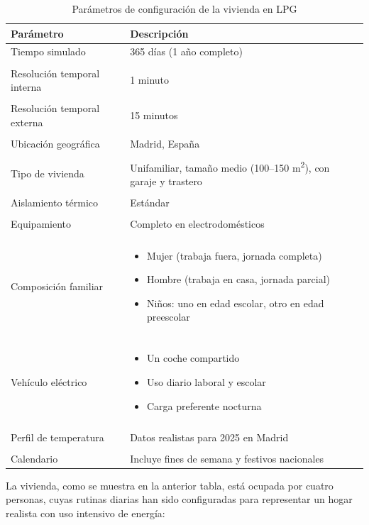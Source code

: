 \begin{table}[H]
    \centering
    \begin{tabular}{p{4cm} p{9.8cm}}
        \\[-1.5ex] %
        \toprule
        \textbf{Parámetro} & \textbf{Descripción} \\
        \midrule
        Tiempo simulado & 365 días (1 año completo) \\
        \\[-1.5ex]
        Resolución temporal interna & 1 minuto \\
        \\[-1.5ex]
        Resolución temporal externa & 15 minutos \\
        \\[-1.5ex]
        Ubicación geográfica & Madrid, España \\
        \\[-1.5ex]
        Tipo de vivienda & Unifamiliar, tamaño medio (100–150 m\textsuperscript{2}), con garaje y trastero \\
        \\[-1.5ex]
        Aislamiento térmico & Estándar \\
        \\[-1.5ex]
        Equipamiento & Completo en electrodomésticos \\
        \\[-1.5ex]
        Composición familiar &
        \begin{itemize}[noitemsep, topsep=-10pt]
            \item Mujer (trabaja fuera, jornada completa)
            \item Hombre (trabaja en casa, jornada parcial)
            \item Niños: uno en edad escolar, otro en edad preescolar
        \end{itemize} \\
        \\[-1.5ex]
        Vehículo eléctrico &
        \begin{itemize}[noitemsep, topsep=-10pt]
            \item Un coche compartido
            \item Uso diario laboral y escolar
            \item Carga preferente nocturna
        \end{itemize} \\
        \\[-1.5ex]
        Perfil de temperatura & Datos realistas para 2025 en Madrid \\
        \\[-1.5ex]
        Calendario & Incluye fines de semana y festivos nacionales \\
        \bottomrule
    \end{tabular}
    \caption{Parámetros de configuración de la vivienda en LPG}
\end{table}
La vivienda, como se muestra en la anterior tabla, está ocupada por cuatro personas, cuyas rutinas 
diarias han sido configuradas para representar un hogar realista con uso intensivo de energía:

